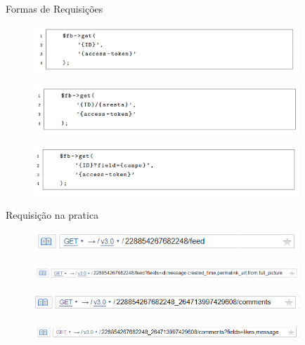 \documentclass{aula-ifb}
\begin{document}
\begin{frame}{Formas de Requisições}
\begin{figure}[h]
\includegraphics[width=10cm]{figuras/requisicaovertice.png}
\label{fig:facebookgraph}
\end{figure}

\begin{figure}[h]
\includegraphics[width=10cm]{figuras/requisicaoaresta.png}
\label{fig:facebookgraph}
\end{figure}

\begin{figure}[h]
\includegraphics[width=10cm]{figuras/requisicaocampo.png}
\label{fig:facebookgraph}
\end{figure}
\end{frame}

\begin{frame}{Requisição na pratica}
	\begin{figure}[h]
		\includegraphics[width=10cm]{figuras/requisicao3.png}
		\label{fig:facebookgraph}
	\end{figure}

	\begin{figure}[h]
		\includegraphics[width=10cm]{figuras/requisicao1.png}
		\label{fig:facebookgraph}
	\end{figure}
	
	\begin{figure}[h]
		\includegraphics[width=10cm]{figuras/requisicao4.png}
		\label{fig:facebookgraph}
	\end{figure}
	
	\begin{figure}[h]
		\includegraphics[width=10cm]{figuras/requisicao5.png}
		\label{fig:facebookgraph}
	\end{figure}
\end{frame}
\end{document}

